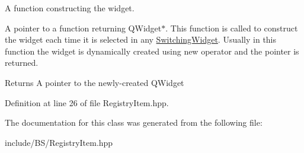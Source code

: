 A function constructing the widget. 

A pointer to a function returning Q\+Widget$\ast$. This function is called to construct the widget each time it is selected in any \hyperlink{class_switching_widget}{Switching\+Widget}. Usually in this function the widget is dynamically created using {\ttfamily new} operator and the pointer is returned. \begin{DoxyReturn}{Returns}
A pointer to the newly-\/created Q\+Widget 
\end{DoxyReturn}


Definition at line 26 of file Registry\+Item.\+hpp.



The documentation for this class was generated from the following file\+:\begin{DoxyCompactItemize}
\item 
include/\+B\+S/Registry\+Item.\+hpp\end{DoxyCompactItemize}

